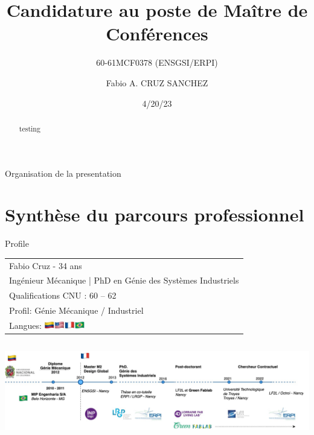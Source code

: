\documentclass[
  11pt,
  ignorenonframetext,
  aspectratio=169,
  c]{beamer}
\title{Candidature au poste de Maître de Conférences}
\subtitle{60-61MCF0378 (ENSGSI/ERPI)}
\author{Fabio A. CRUZ SANCHEZ}
\date{4/20/23}
\institute{Section CNU 60}
\begin{document}
\frame{\titlepage}
\begin{abstract}
testing
\end{abstract}
\ifdefined\Shaded\renewenvironment{Shaded}{\begin{tcolorbox}[frame hidden, sharp corners, borderline west={3pt}{0pt}{shadecolor}, boxrule=0pt, breakable, enhanced, interior hidden]}{\end{tcolorbox}}\fi

\begin{frame}[plain]{Organisation de la presentation}
\protect\hypertarget{organisation-de-la-presentation}{}
\tableofcontents[hideallsubsections]

\end{frame}

\hypertarget{synthuxe8se-du-parcours-professionnel}{%
\section{Synthèse du parcours
professionnel}\label{synthuxe8se-du-parcours-professionnel}}

\begin{frame}[t]{Profile}
\protect\hypertarget{profile}{}
\extrarowsep=-1.5pt
\begin{tabu} to 
Fabio Cruz - 34 ans  \\
Ingénieur Mécanique | PhD en Génie des Systèmes Industriels \\
Qualifications CNU : 60 – 62 \\
Profil:  Génie Mécanique / Industriel\\
Langues: \includegraphics[width=50pt]{Figures/slides/Langues.jpg}


\end{tabu}

\begin{columns}[T]
\begin{column}[c]{1\textwidth}
\includegraphics{Figures/slides/Fabio-timeline-Parcours.jpg}
\end{column}
\end{columns}

\note{}
\end{frame}
\end{document}
